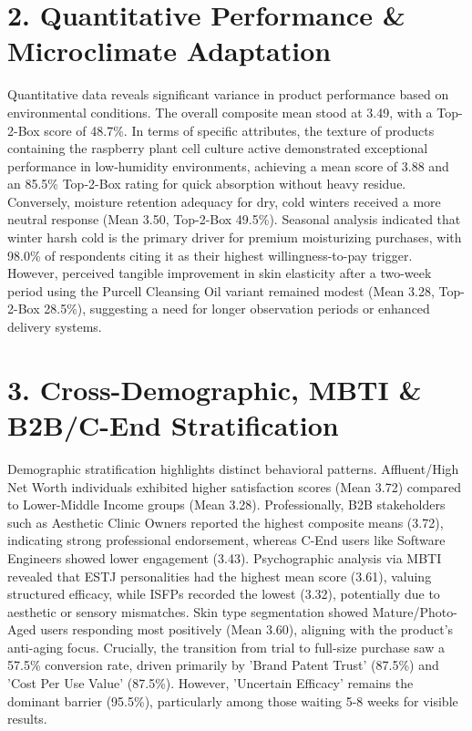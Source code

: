 \documentclass[10pt,twocolumn,a4paper]{article}
\begin{document}
\section{2. Quantitative Performance \& Microclimate Adaptation}
Quantitative data reveals significant variance in product performance based on environmental conditions. The overall composite mean stood at 3.49, with a Top-2-Box score of 48.7\%. In terms of specific attributes, the texture of products containing the raspberry plant cell culture active demonstrated exceptional performance in low-humidity environments, achieving a mean score of 3.88 and an 85.5\% Top-2-Box rating for quick absorption without heavy residue. Conversely, moisture retention adequacy for dry, cold winters received a more neutral response (Mean 3.50, Top-2-Box 49.5\%). Seasonal analysis indicated that winter harsh cold is the primary driver for premium moisturizing purchases, with 98.0\% of respondents citing it as their highest willingness-to-pay trigger. However, perceived tangible improvement in skin elasticity after a two-week period using the Purcell Cleansing Oil variant remained modest (Mean 3.28, Top-2-Box 28.5\%), suggesting a need for longer observation periods or enhanced delivery systems.
\section{3. Cross-Demographic, MBTI \& B2B/C-End Stratification}
Demographic stratification highlights distinct behavioral patterns. Affluent/High Net Worth individuals exhibited higher satisfaction scores (Mean 3.72) compared to Lower-Middle Income groups (Mean 3.28). Professionally, B2B stakeholders such as Aesthetic Clinic Owners reported the highest composite means (3.72), indicating strong professional endorsement, whereas C-End users like Software Engineers showed lower engagement (3.43). Psychographic analysis via MBTI revealed that ESTJ personalities had the highest mean score (3.61), valuing structured efficacy, while ISFPs recorded the lowest (3.32), potentially due to aesthetic or sensory mismatches. Skin type segmentation showed Mature/Photo-Aged users responding most positively (Mean 3.60), aligning with the product's anti-aging focus. Crucially, the transition from trial to full-size purchase saw a 57.5\% conversion rate, driven primarily by 'Brand Patent Trust' (87.5\%) and 'Cost Per Use Value' (87.5\%). However, 'Uncertain Efficacy' remains the dominant barrier (95.5\%), particularly among those waiting 5-8 weeks for visible results.
\end{document}
